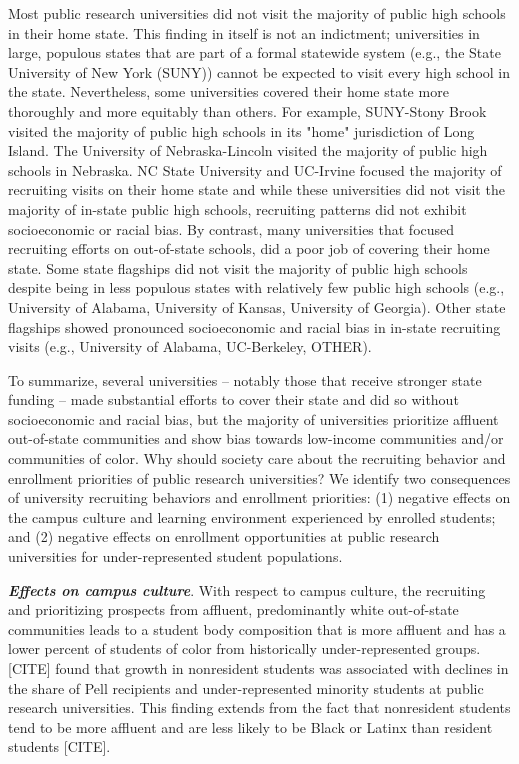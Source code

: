 \documentclass[twoside]{article}
\begin{document}
Most public research universities did not visit the majority of public high schools in their home state. This finding in itself is not an indictment; universities in large, populous states that are part of a formal statewide system (e.g., the State University of New York (SUNY)) cannot be expected to visit every high school in the state. Nevertheless, some universities covered their home state more thoroughly and more equitably than others.  For example, SUNY-Stony Brook visited the majority of public high schools in its "home" jurisdiction of Long Island. The University of Nebraska-Lincoln visited the majority of public high schools in Nebraska.  NC State University and UC-Irvine focused the majority of recruiting visits on their home state and while these universities did not visit the majority of in-state public high schools, recruiting patterns did not exhibit socioeconomic or racial bias.  By contrast, many universities that focused recruiting efforts on out-of-state schools, did a poor job of covering their home state. Some state flagships did not visit the majority of public high schools despite being in less populous states with relatively few public high schools (e.g., University of Alabama, University of Kansas, University of Georgia).  Other state flagships showed pronounced socioeconomic and racial bias in in-state recruiting visits (e.g., University of Alabama, UC-Berkeley, OTHER).  

To summarize, several universities -- notably those that receive stronger state funding -- made substantial efforts to cover their state and did so without socioeconomic and racial bias, but the majority of universities prioritize affluent out-of-state communities and show bias towards low-income communities and/or communities of color. Why should society care about the recruiting behavior and enrollment priorities of public research universities? We identify two consequences of university recruiting behaviors and enrollment priorities: (1) negative effects on the campus culture and learning environment experienced by enrolled students; and (2) negative effects on enrollment opportunities at public research universities for under-represented student populations.

\textbf{\textit{Effects on campus culture}}.  With respect to campus culture, the recruiting and prioritizing prospects from affluent, predominantly white out-of-state communities leads to a student body composition that is more affluent and has a lower percent of students of color from historically under-represented groups.  [CITE] found that growth in nonresident students was associated with declines in the share of Pell recipients and under-represented minority students at public research universities.  This finding extends from the fact that nonresident students tend to be more affluent and are less likely to be Black or Latinx than resident students [CITE].
\end{document}
